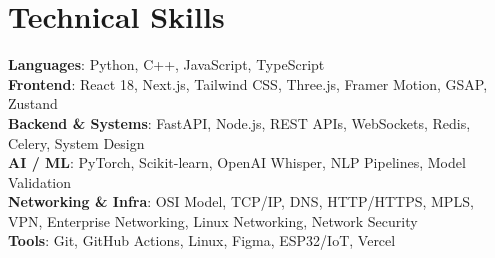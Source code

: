 \documentclass[letterpaper,10pt]{article}
\begin{document}
\section{Technical Skills}

\textbf{Languages}: Python, C++, JavaScript, TypeScript\\
\textbf{Frontend}: React 18, Next.js, Tailwind CSS, Three.js, Framer Motion, GSAP, Zustand\\
\textbf{Backend \& Systems}: FastAPI, Node.js, REST APIs, WebSockets, Redis, Celery, System Design\\
\textbf{AI / ML}: PyTorch, Scikit-learn, OpenAI Whisper, NLP Pipelines, Model Validation\\
\textbf{Networking \& Infra}: OSI Model, TCP/IP, DNS, HTTP/HTTPS, MPLS, VPN, Enterprise Networking, Linux Networking, Network Security\\
\textbf{Tools}: Git, GitHub Actions, Linux, Figma, ESP32/IoT, Vercel
\end{document}
